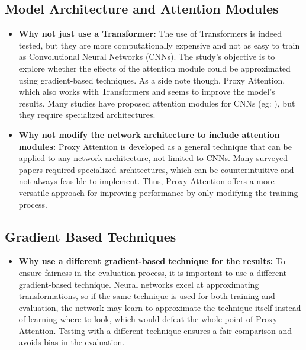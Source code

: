 \documentclass[a4paper,11pt,openright]{book}
\begin{document}
\subsection{Model Architecture and Attention Modules}
\begin{itemize}
    \item \textbf{Why not just use a Transformer: }The use of Transformers is indeed tested, but they are more computationally expensive and not as easy to train as Convolutional Neural Networks (CNNs). The study's objective is to explore whether the effects of the attention module could be approximated using gradient-based techniques. As a side note though, Proxy Attention, which also works with Transformers and seems to improve the model's results. Many studies have proposed attention modules for CNNs (eg: \cite{jetleyLearnPayAttention2018}), but they require specialized architectures. 
    \item \textbf{Why not modify the network architecture to include attention modules: }Proxy Attention is developed as a general technique that can be applied to any network architecture, not limited to CNNs. Many surveyed papers required specialized architectures, which can be counterintuitive and not always feasible to implement. Thus, Proxy Attention offers a more versatile approach for improving performance by only modifying the training process.
\end{itemize}

\subsection{Gradient Based Techniques}
\begin{itemize}
    \item \textbf{Why use a different gradient-based technique for the results: } To ensure fairness in the evaluation process, it is important to use a different gradient-based technique. Neural networks excel at approximating transformations, so if the same technique is used for both training and evaluation, the network may learn to approximate the technique itself instead of learning where to look, which would defeat the whole point of Proxy Attention. Testing with a different technique ensures a fair comparison and avoids bias in the evaluation.

\end{itemize}
\end{document}
